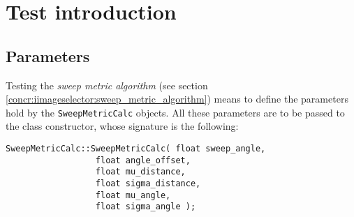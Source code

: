 \section{Test introduction}
\label{performance_evaluation:testintro}


\subsection{Parameters}
\label{performance_evaluation:testintro:parameters}

Testing the \textit{sweep metric algorithm} (see section
\ref{concr:iimageselector:sweep_metric_algorithm}) means to define
the parameters hold by the \texttt{SweepMetricCalc}
objects. All these parameters are 
to be passed to the class constructor, whose signature
is the following:
\\
\begin{lstlisting}[caption={\texttt{SweepMetricCalc} class declaration},
    label={code:sweepmetriccalc}]
SweepMetricCalc::SweepMetricCalc( float sweep_angle,
				  float angle_offset,
				  float mu_distance,
				  float sigma_distance,
				  float mu_angle,
				  float sigma_angle );				  
\end{lstlisting}


